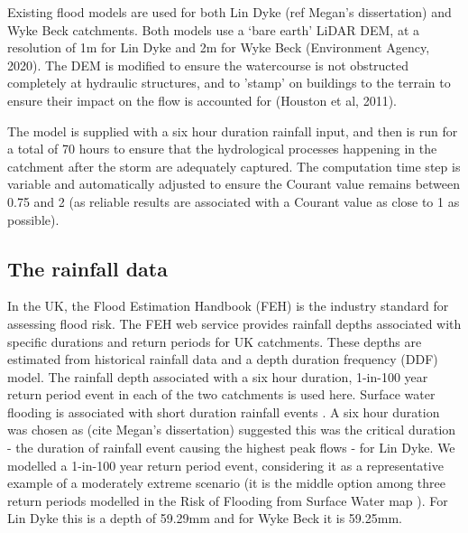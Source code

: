 \documentclass[APA,Times2COL]{WileyNJDv5}
\begin{document}
Existing flood models are used for both Lin Dyke (ref Megan's dissertation) and Wyke Beck \citep{singh2023drainage} catchments. Both models use a `bare earth' LiDAR DEM, at a resolution of 1m for Lin Dyke and 2m for Wyke Beck (Environment Agency, 2020). The DEM is modified to ensure the watercourse is not obstructed completely at hydraulic structures, and to 'stamp' on buildings to the terrain to ensure their impact on the flow is accounted for (Houston et al, 2011). 

The model is supplied with a six hour duration rainfall input, and then is run for a total of 70 hours to ensure that the hydrological processes happening in the catchment after the storm are adequately captured. The computation time step is variable and automatically adjusted to ensure the Courant value remains between 0.75 and 2 (as reliable results are associated with a Courant value as close to 1 as possible).



\subsection{The rainfall data}\label{sec:rainfalldata}
In the UK, the Flood Estimation Handbook (FEH) is the industry standard for assessing flood risk. The FEH web service provides rainfall depths associated with specific durations and return periods for UK catchments. These depths are estimated from historical rainfall data and a depth duration frequency (DDF) model. The rainfall depth associated with a six hour duration, 1-in-100 year return period event in each of the two catchments is used here.  Surface water flooding is associated with short duration rainfall events \citep{rudd2020investigating}. A six hour duration was chosen as (cite Megan's dissertation) suggested this was the critical duration - the duration of rainfall event causing the highest peak flows \citep{daviescritical} - for Lin Dyke. We modelled a 1-in-100 year return period event, considering it as a representative example of a moderately extreme scenario (it is the middle option among three return periods modelled in the Risk of Flooding from Surface Water map \citep{environment2019risk}). For Lin Dyke this is a depth of 59.29mm and for Wyke Beck it is 59.25mm.
\end{document}
